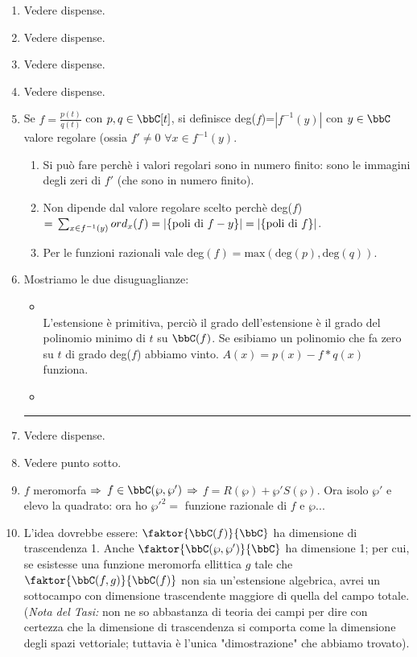 \begin{enumerate}
\item Vedere dispense.
\item Vedere dispense.
\item Vedere dispense.
\item Vedere dispense.
\item Se $f=\frac{p(t)}{q(t)}$ con $p, q\in \bbC[t]$, si definisce deg($f$)=$|f^{-1}(y)|$ con $y\in \bbC$ valore regolare (ossia $f'\neq 0$ $\forall x\in f^{-1}(y)$.
	\begin{enumerate}[label=(\alph*)]
	\item Si può fare perchè i valori regolari sono in numero finito: sono le immagini degli zeri di $f'$ (che sono in numero finito).
	\item Non dipende dal valore regolare scelto perchè deg($f$)$=\\
		\sum_{x\in f^{-1}(y)}ord_{x}(f)=|\{\mbox{poli di } f-y\}|=|\{\mbox{poli di } f\}|$.
	\item Per le funzioni razionali vale deg$(f)=\mbox{max}(\mbox{deg}(p), \mbox{deg}(q))$.
	\end{enumerate}
\item Mostriamo le due disuguaglianze:
\begin{itemize}
	\item {}\\
		L'estensione è primitiva, perciò il grado dell'estensione è il grado del polinomio minimo di $t$ su $\bbC(f)$. Se esibiamo un polinomio che fa zero su $t$ di grado deg($f$) abbiamo vinto. $A(x)=p(x)-f*q(x)$ funziona.
\bigskip
	\item {}\\
\end{itemize}
\bigskip
\hrule
\bigskip
\item Vedere dispense.
\item Vedere punto sotto. 
\item $f$ meromorfa $\Rightarrow$ $f\in \bbC(\wp, \wp')$ $\Rightarrow$ $f=R(\wp)+\wp'S(\wp)$. Ora isolo $\wp'$ e elevo la quadrato: ora ho $\wp'^{2}=$ funzione razionale di $f$ e $\wp$...
\item L'idea dovrebbe essere: $\faktor{\bbC(f)}{\bbC}$ ha dimensione di trascendenza 1. Anche $\faktor{\bbC(\wp, \wp')}{\bbC}$ ha dimensione 1; per cui, se esistesse una funzione meromorfa ellittica $g$ tale che $\faktor{\bbC(f,g)}{\bbC(f)}$ non sia un'estensione algebrica, avrei un sottocampo con dimensione trascendente maggiore di quella del campo totale. ({\it Nota del Tasi:} non ne so abbastanza di teoria dei campi per dire con certezza che la dimensione di trascendenza si comporta come la dimensione degli spazi vettoriale; tuttavia è l'unica "dimostrazione" che abbiamo trovato).

\end{enumerate}
